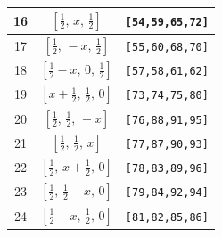 \documentclass[fleqn,8pt]{jsarticle}
\begin{document}
\begin{longtable}{ccc}
16 & $\left[ \frac{1}{2},\, x,\, \frac{1}{2} \right]$ & {\tt [54,59,65,72]} \\ \hline
17 & $\left[ \frac{1}{2},\, - x,\, \frac{1}{2} \right]$ & {\tt [55,60,68,70]} \\ \hline
18 & $\left[ \frac{1}{2} - x,\, 0,\, \frac{1}{2} \right]$ & {\tt [57,58,61,62]} \\ \hline
19 & $\left[ x + \frac{1}{2},\, \frac{1}{2},\, 0 \right]$ & {\tt [73,74,75,80]} \\ \hline
20 & $\left[ \frac{1}{2},\, \frac{1}{2},\, - x \right]$ & {\tt [76,88,91,95]} \\ \hline
21 & $\left[ \frac{1}{2},\, \frac{1}{2},\, x \right]$ & {\tt [77,87,90,93]} \\ \hline
22 & $\left[ \frac{1}{2},\, x + \frac{1}{2},\, 0 \right]$ & {\tt [78,83,89,96]} \\ \hline
23 & $\left[ \frac{1}{2},\, \frac{1}{2} - x,\, 0 \right]$ & {\tt [79,84,92,94]} \\ \hline
24 & $\left[ \frac{1}{2} - x,\, \frac{1}{2},\, 0 \right]$ & {\tt [81,82,85,86]} \\
\end{longtable}
\renewcommand{\arraystretch}{1.2}
\end{document}
